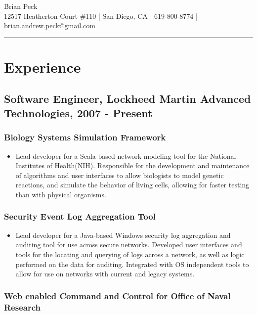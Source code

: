 \documentclass[11pt]{article}
\title{}
\date{}
\begin{document}
\begin{center}
{\huge Brian Peck} \\
12517 Heatherton Court \#110 | San Diego, CA | 619-800-8774 | brian.andrew.peck@gmail.com
\hrule
\end{center}

\section*{Experience}
\label{sec-1}

\subsection*{Software Engineer, Lockheed Martin Advanced Technologies, 2007 - Present}
\label{sec-1.1}

\subsubsection*{Biology Systems Simulation Framework}
\label{sec-1.1.1}

\begin{itemize}
\item Lead developer for a Scala-based network modeling tool for the National Institutes of Health(NIH). Responsible for the development and maintenance of algorithms and user interfaces to allow biologists to model genetic reactions, and simulate the behavior of living cells, allowing for faster testing than with physical organisms.
\end{itemize}
\subsubsection*{Security Event Log Aggregation Tool}
\label{sec-1.1.2}

\begin{itemize}
\item Lead developer for a Java-based Windows security log aggregation and auditing tool for use across secure networks. Developed user interfaces and tools for the locating and querying of logs across a network, as well as logic performed on the data for auditing. Integrated with OS independent tools to allow for use on networks with current and legacy systems.
\end{itemize}
\subsubsection*{Web enabled Command and Control for Office of Naval Research}
\label{sec-1.1.3}
\end{document}
